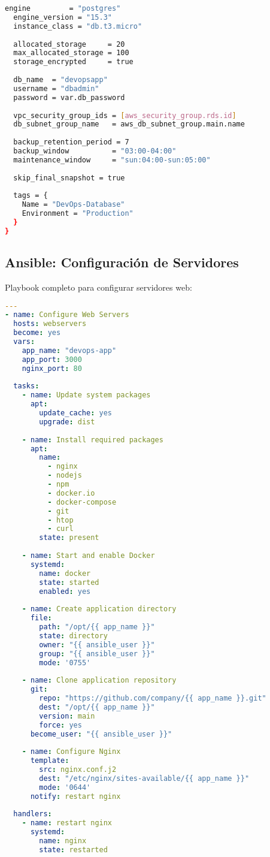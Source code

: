 \documentclass[12pt,a4paper]{article}
\begin{document}
\begin{lstlisting}[language=bash, caption=Terraform - Infraestructura AWS completa]
  engine         = "postgres"
  engine_version = "15.3"
  instance_class = "db.t3.micro"
  
  allocated_storage     = 20
  max_allocated_storage = 100
  storage_encrypted     = true
  
  db_name  = "devopsapp"
  username = "dbadmin"
  password = var.db_password
  
  vpc_security_group_ids = [aws_security_group.rds.id]
  db_subnet_group_name   = aws_db_subnet_group.main.name
  
  backup_retention_period = 7
  backup_window          = "03:00-04:00"
  maintenance_window     = "sun:04:00-sun:05:00"
  
  skip_final_snapshot = true
  
  tags = {
    Name = "DevOps-Database"
    Environment = "Production"
  }
}
\end{lstlisting}

\subsection{Ansible: Configuración de Servidores}
Playbook completo para configurar servidores web:
\begin{lstlisting}[language=yaml, caption=Ansible - Playbook de configuración]
---
- name: Configure Web Servers
  hosts: webservers
  become: yes
  vars:
    app_name: "devops-app"
    app_port: 3000
    nginx_port: 80
    
  tasks:
    - name: Update system packages
      apt:
        update_cache: yes
        upgrade: dist
        
    - name: Install required packages
      apt:
        name:
          - nginx
          - nodejs
          - npm
          - docker.io
          - docker-compose
          - git
          - htop
          - curl
        state: present
        
    - name: Start and enable Docker
      systemd:
        name: docker
        state: started
        enabled: yes
        
    - name: Create application directory
      file:
        path: "/opt/{{ app_name }}"
        state: directory
        owner: "{{ ansible_user }}"
        group: "{{ ansible_user }}"
        mode: '0755'
        
    - name: Clone application repository
      git:
        repo: "https://github.com/company/{{ app_name }}.git"
        dest: "/opt/{{ app_name }}"
        version: main
        force: yes
      become_user: "{{ ansible_user }}"
      
    - name: Configure Nginx
      template:
        src: nginx.conf.j2
        dest: "/etc/nginx/sites-available/{{ app_name }}"
        mode: '0644'
      notify: restart nginx
        
  handlers:
    - name: restart nginx
      systemd:
        name: nginx
        state: restarted
\end{lstlisting}
\end{document}
